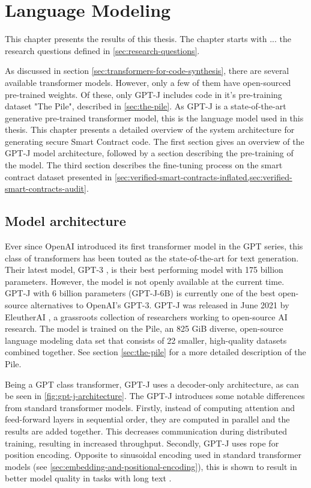 \chapter{Language Modeling}
\label{chap:language-modeling}
This chapter presents the results of this thesis. The chapter starts with ... the research questions defined in \cref{sec:research-questions}.

As discussed in section \cref{sec:transformers-for-code-synthesis}, there are several available transformer models. However, only a few of them have open-sourced pre-trained weights. Of these, only GPT-J \cite{gpt-j} includes code in it's pre-training dataset "The Pile", described in \cref{sec:the-pile}. As GPT-J is a state-of-the-art generative pre-trained transformer model, this is the language model used in this thesis. This chapter presents a detailed overview of the system architecture for generating secure Smart Contract code. The first section gives an overview of the GPT-J model architecture, followed by a section describing the pre-training of the model. The third section describes the fine-tuning process on the smart contract dataset presented in \cref{sec:verified-smart-contracts-inflated,sec:verified-smart-contracts-audit}. 


\section{Model architecture}
\label{sec:architecture}
Ever since OpenAI introduced its first transformer model in the GPT series, this class of transformers has been touted as the state-of-the-art for text generation. Their latest model, GPT-3 \cite{brown2020language}, is their best performing model with 175 billion parameters. However, the model is not openly available at the current time. GPT-J \cite{gpt-j} with 6 billion parameters (GPT-J-6B) is currently one of the best open-source alternatives to OpenAI's GPT-3. GPT-J was released in June 2021 by EleutherAI \cite{elutherai}, a grassroots collection of researchers working to open-source AI research. The model is trained on the Pile, an 825 GiB diverse, open-source language modeling data set that consists of 22 smaller, high-quality datasets combined together. See section \cref{sec:the-pile} for a more detailed description of the Pile.

Being a GPT class transformer, GPT-J uses a decoder-only architecture, as can be seen in \cref{fig:gpt-j-architecture}. The GPT-J introduces some notable differences from standard transformer models. Firstly, instead of computing attention and feed-forward layers in sequential order, they are computed in parallel and the results are added together. This decreases communication during distributed training, resulting in increased throughput. Secondly, GPT-J uses \acrfull{rope} \cite{su2021roformer} for position encoding. Opposite to sinusoidal encoding used in standard transformer models (see \cref{sec:embedding-and-positional-encoding}), this is shown to result in better model quality in tasks with long text \cite{su2021roformer}.

